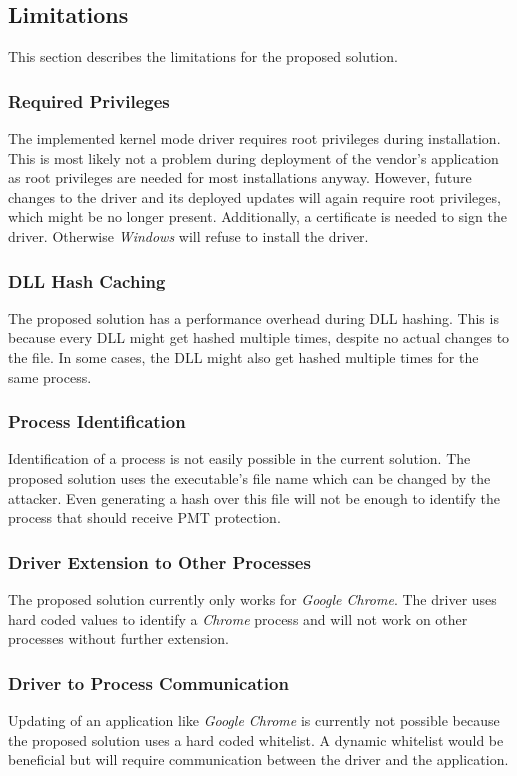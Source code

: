 \subsection{Limitations}
This section describes the limitations for the proposed solution.
\subsubsection{Required Privileges}
The implemented kernel mode driver requires root privileges during installation. This is most likely not a problem during deployment of the vendor's application as root privileges are needed for most installations anyway. However, future changes to the driver and its deployed updates will again require root privileges, which might be no longer present. Additionally, a certificate is needed to sign the driver. Otherwise \emph{Windows} will refuse to install the driver.
\subsubsection{DLL Hash Caching}
The proposed solution has a performance overhead during \gls{DLL} hashing. This is because every \gls{DLL} might get hashed multiple times, despite no actual changes to the file. In some cases, the \gls{DLL} might also get hashed multiple times for the same process. 
\subsubsection{Process Identification}
Identification of a process is not easily possible in the current solution. The proposed solution uses the executable's file name which can be changed by the attacker. Even generating a hash over this file will not be enough to identify the process that should receive \gls{PMT} protection. 
\subsubsection{Driver Extension to Other Processes}
The proposed solution currently only works for \emph{Google Chrome}. The driver uses hard coded values to identify a \emph{Chrome} process and will not work on other processes without further extension.
\subsubsection{Driver to Process Communication}
Updating of an application like \emph{Google Chrome} is currently not possible because the proposed solution uses a hard coded whitelist. A dynamic whitelist would be beneficial but will require communication between the driver and the application.